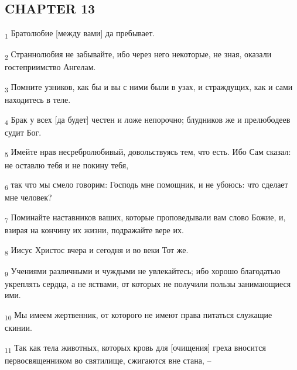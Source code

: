 \subsection{CHAPTER 13}
\begin{tcolorbox}
\textsubscript{1} Братолюбие [между вами] да пребывает.
\end{tcolorbox}
\begin{tcolorbox}
\textsubscript{2} Страннолюбия не забывайте, ибо через него некоторые, не зная, оказали гостеприимство Ангелам.
\end{tcolorbox}
\begin{tcolorbox}
\textsubscript{3} Помните узников, как бы и вы с ними были в узах, и страждущих, как и сами находитесь в теле.
\end{tcolorbox}
\begin{tcolorbox}
\textsubscript{4} Брак у всех [да будет] честен и ложе непорочно; блудников же и прелюбодеев судит Бог.
\end{tcolorbox}
\begin{tcolorbox}
\textsubscript{5} Имейте нрав несребролюбивый, довольствуясь тем, что есть. Ибо Сам сказал: не оставлю тебя и не покину тебя,
\end{tcolorbox}
\begin{tcolorbox}
\textsubscript{6} так что мы смело говорим: Господь мне помощник, и не убоюсь: что сделает мне человек?
\end{tcolorbox}
\begin{tcolorbox}
\textsubscript{7} Поминайте наставников ваших, которые проповедывали вам слово Божие, и, взирая на кончину их жизни, подражайте вере их.
\end{tcolorbox}
\begin{tcolorbox}
\textsubscript{8} Иисус Христос вчера и сегодня и во веки Тот же.
\end{tcolorbox}
\begin{tcolorbox}
\textsubscript{9} Учениями различными и чуждыми не увлекайтесь; ибо хорошо благодатью укреплять сердца, а не яствами, от которых не получили пользы занимающиеся ими.
\end{tcolorbox}
\begin{tcolorbox}
\textsubscript{10} Мы имеем жертвенник, от которого не имеют права питаться служащие скинии.
\end{tcolorbox}
\begin{tcolorbox}
\textsubscript{11} Так как тела животных, которых кровь для [очищения] греха вносится первосвященником во святилище, сжигаются вне стана, --
\end{tcolorbox}
